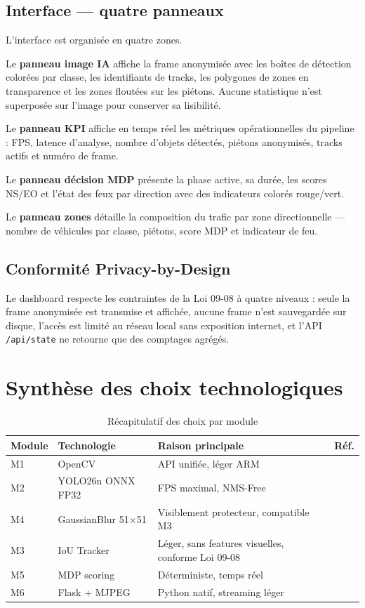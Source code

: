 \subsection{Interface — quatre panneaux}

L'interface est organisée en quatre zones.

Le \textbf{panneau image IA} affiche la
frame anonymisée avec les boîtes de
détection colorées par classe, les
identifiants de tracks, les polygones
de zones en transparence et les zones
floutées sur les piétons. Aucune
statistique n'est superposée sur l'image
pour conserver sa lisibilité.

Le \textbf{panneau KPI} affiche en temps
réel les métriques opérationnelles du
pipeline : FPS, latence d'analyse,
nombre d'objets détectés, piétons
anonymisés, tracks actifs et numéro
de frame.

Le \textbf{panneau décision MDP} présente
la phase active, sa durée, les scores
NS/EO et l'état des feux par direction
avec des indicateurs colorés rouge/vert.

Le \textbf{panneau zones} détaille la
composition du trafic par zone directionnelle
— nombre de véhicules par classe, piétons,
score MDP et indicateur de feu.

\subsection{Conformité Privacy-by-Design}

Le dashboard respecte les contraintes
de la Loi 09-08 à quatre niveaux : seule
la frame anonymisée est transmise et
affichée, aucune frame n'est sauvegardée
sur disque, l'accès est limité au réseau
local sans exposition internet, et l'API
\texttt{/api/state} ne retourne que des
comptages agrégés.

\section{Synthèse des choix technologiques}

\begin{table}[H]
\centering
\caption{Récapitulatif des choix par module}
\begin{tabularx}{\textwidth}{llXl}
\toprule
\textbf{Module} &
\textbf{Technologie} &
\textbf{Raison principale} &
\textbf{Réf.} \\
\midrule
M1 & OpenCV &
API unifiée, léger ARM &
\cite{ficili2025} \\
M2 & YOLO26n ONNX FP32 &
FPS maximal, NMS-Free &
\cite{sapkota2025} \\
M4 & GaussianBlur 51×51 &
Visiblement protecteur,
compatible M3 &
\cite{jeremiah2024} \\
M3 & IoU Tracker &
Léger, sans features visuelles,
conforme Loi 09-08 &
\cite{wang2025} \\
M5 & MDP scoring &
Déterministe, temps réel &
\cite{michailidis2025} \\
M6 & Flask + MJPEG &
Python natif, streaming léger &
\cite{ficili2025} \\
\bottomrule
\end{tabularx}
\label{tab:tech_choices}
\end{table}

